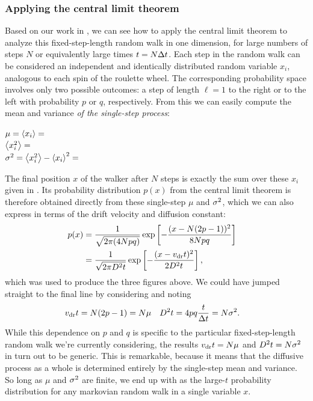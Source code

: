 \subsubsection{\label{sec:RW_CLT}Applying the central limit theorem}
Based on our work in , we can see how to apply the central limit theorem to analyze this fixed-step-length random walk in one dimension, for large numbers of steps $N$ or equivalently large times $t = N \Delta t$.
Each step in the random walk can be considered an independent and identically distributed random variable $x_i$, analogous to each spin of the roulette wheel.
The corresponding probability space involves only two possible outcomes: a step of length $\ell = 1$ to the right or to the left with probability $p$ or $q$, respectively.
From this we can easily compute the mean and variance \textit{of the single-step process}:
\begin{mdframed}
  $\mu = \left\langle x_i \right\rangle = $ \\[33 pt]
  $\left\langle x_i^2 \right\rangle = $ \\[33 pt]
  $\sigma^2 = \left\langle x_i^2 \right\rangle - \left\langle x_i \right\rangle^2 = $ \\[30 pt]
\end{mdframed}

The final position $x$ of the walker after $N$ steps is exactly the sum over these $x_i$ given in .
Its probability distribution $p(x)$ from the central limit theorem is therefore obtained directly from these single-step $\mu$ and $\sigma^2$, which we can also express in terms of the drift velocity and diffusion constant:
\begin{align}
  p(x) & = \frac{1}{\sqrt{2\pi (4Npq)}} \exp\left[-\frac{(x - N(2p - 1))^2}{8Npq}\right] \cr
       & = \frac{1}{\sqrt{2\pi D^2 t}} \exp\left[-\frac{(x - v_{\mathrm{dr}} t)^2}{2D^2 t}\right], \label{eq:RW_CLT}
\end{align}
which was used to produce the three figures above.
We could have jumped straight to the final line by considering  and noting
\begin{align}
  \label{eq:single_step}
  v_{\mathrm{dr}} t & = N(2p - 1) = N \mu &
  D^2 t & = 4pq \frac{t}{\Delta t} = N \sigma^2.
\end{align}
While this dependence on $p$ and $q$ is specific to the particular fixed-step-length random walk we're currently considering, the results $v_{\mathrm{dr}} t = N \mu$ and $D^2 t = N \sigma^2$ in  turn out to be generic.
This is remarkable, because it means that the diffusive process as a whole is determined entirely by the single-step mean and variance.
So long as $\mu$ and $\sigma^2$ are finite, we end up with  as the large-$t$ probability distribution for any markovian random walk in a single variable $x$.

